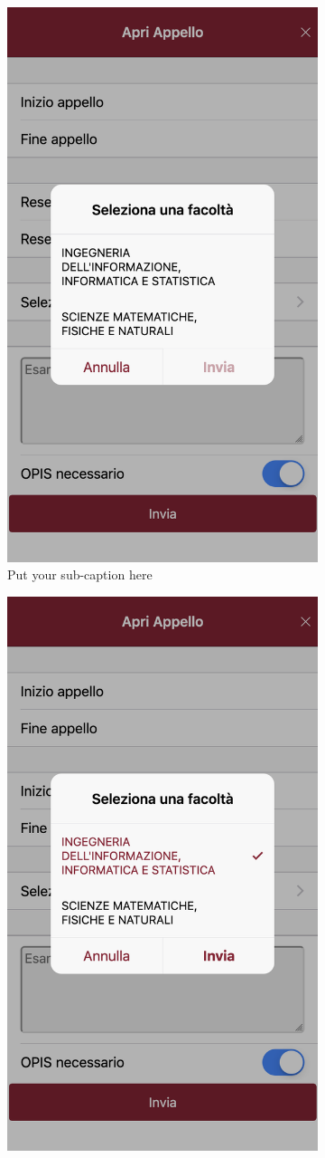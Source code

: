 \documentclass[Lau, oneside, noexaminfo]{sapthesis}%
\begin{document}
\begin{figure}[H]
	\begin{subfigure}{0.6\textwidth}
	  \centering
	  \includegraphics[width=0.5\linewidth]{ui-iterations/iii/facolta-1}  
	  \caption{Put your sub-caption here}
	  \label{fig:sub-first}
	\end{subfigure}
	\begin{subfigure}{0.6\textwidth}
	  \centering
	  \includegraphics[width=0.5\linewidth]{ui-iterations/iii/facolta-2}  

\end{subfigure}
\end{figure}
\end{document}
